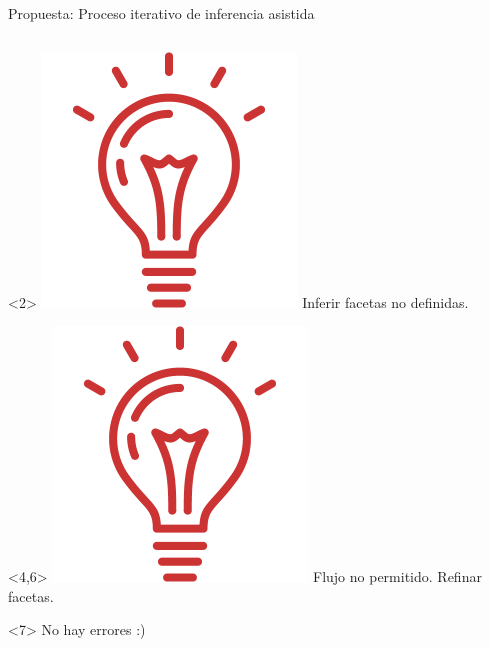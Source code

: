 \documentclass[aspectratio=169,10pt]{beamer}
\begin{document}
\begin{frame}[fragile]{Propuesta: Proceso iterativo de inferencia asistida}
\begin{columns}
      \begin{column}{0.5\textwidth}  %
				\begin{onlyenv}<2>
          \includegraphics[height=\fontcharht\font`\B*3]{img/bulb.png}
					\colorbox{red!30}{Inferir facetas no definidas.}
			\end{onlyenv}
			\begin{onlyenv}<4,6>
				\includegraphics[height=\fontcharht\font`\B*3]{img/bulb.png}
				\colorbox{red!30}{Flujo no permitido. Refinar facetas.}
		\end{onlyenv}
		\begin{onlyenv}<7>
			\colorbox{green!30}{No hay errores :)}
	\end{onlyenv}
      \end{column}
    \end{columns}



\end{frame}
\end{document}

